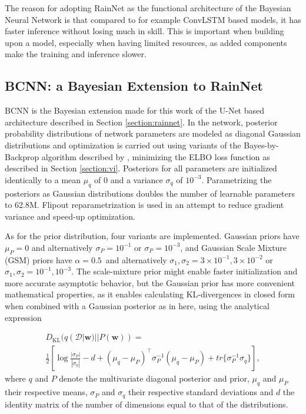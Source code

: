 The reason for adopting RainNet as the functional architecture of the Bayesian Neural Network is that compared to for example ConvLSTM based models, it has faster inference without losing much in skill. This is important when building upon a model, especially when having limited resources, as added components make the training and inference slower. 


\subsection{BCNN: a Bayesian Extension to RainNet}

\label{section:bcnn}

BCNN is the Bayesian extension made for this work of the U-Net based architecture described in Section \ref{section:rainnet}. In the network, posterior probability distributions of network parameters are modeled as diagonal Gaussian distributions and optimization is carried out using variants of the Bayes-by-Backprop algorithm described by \citet{blundell_weight_2015}, minimizing the ELBO loss function as described in Section \ref{section:vi}. Posteriors for all parameters are initialized identically to a mean $\mu_q$ of 0 and a variance $\sigma_q$ of $10^{-3}$. Parametrizing the posteriors as Gaussian distributions doubles the number of learnable parameters to 62.8M. Flipout reparametrization \cite{wen_flipout_2018} is used in an attempt to reduce gradient variance and speed-up optimization. 

As for the prior distribution, four variants are implemented. Gaussian priors have $\mu_P = 0$ and alternatively $\sigma_P = 10^{-1}$ or $\sigma_P = 10^{-3}$, and Gaussian Scale Mixture (GSM) priors have $\alpha = 0.5$ and alternatively $\sigma_1, \sigma_2 = 3 \times 10^{-1}, 3 \times 10^{-2}$ or $\sigma_1, \sigma_2 = 10^{-1}, 10^{-3}$. The scale-mixture prior might enable faster initialization and more accurate asymptotic behavior, but the Gaussian prior has more convenient mathematical properties, as it enables calculating KL-divergences in closed form when combined with a Gaussian posterior as in here, using the analytical expression

\begin{multline}
D_{\text{KL}}(q(\mathcal{D}|\pmb{w}) || P(\pmb{w})) =\\
\frac{1}{2}\left[\log \frac{|\sigma_P|}{|\sigma_q|}
- d 
+ (\mu_q - \mu_P)^\top \sigma_P^{-1}(\mu_q - \mu_P)
+ tr\{\sigma_P^{-1}\sigma_q\}
\right],
\end{multline}
%
where $q$ and $P$ denote the multivariate diagonal posterior and prior, $\mu_q$ and $\mu_P$ their respective means, $\sigma_P$ and $\sigma_q$ their respective standard deviations and  $d$ the identity matrix of the number of dimensions equal to that of the distributions. 

